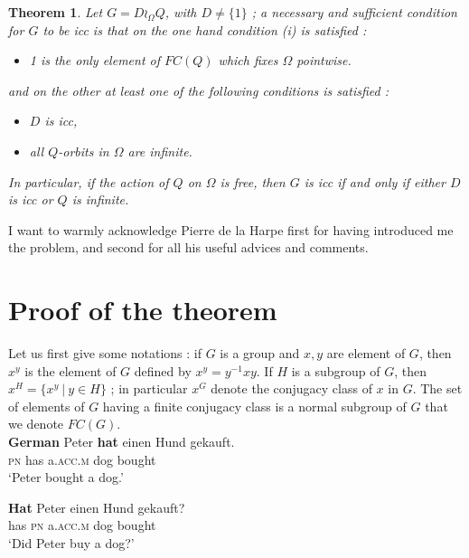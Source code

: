 \documentclass[12pt,oneside]{amsart}
\def\ex{\mathbf{e}}
\newtheorem{theorem}{Theorem}
\begin{document}
\begin{theorem}
Let $G=D\wr_\Omega Q$, with $D\not=\{1\}$ ; a necessary and
sufficient condition for $G$  to be icc is that  on the one hand
condition (i) is satisfied :
\begin{itemize}
\item[\sl(i)]  1 is the only element of $FC(Q)$ which fixes $\Omega$
pointwise. \end{itemize}
 and on the other at least one of the
following conditions is satisfied :
\begin{itemize}
 \item[\sl(ii)] $D$ is icc,
 \item[\sl(iii)] all
$Q$-orbits in $\Omega$ are infinite.
\end{itemize}
In particular, if the action of $Q$ on $\Omega$ is free, then $G$
is icc if and only if either $D$ is icc or $Q$ is infinite.
\end{theorem}




I want to warmly acknowledge Pierre de la Harpe first for having
introduced me the problem, and second for all his useful advices
and
comments.\\


\section{Proof of the theorem}

Let us first give some notations : if $G$ is a group and $x,y$ are
element of $G$, then $x^y$ is the element of $G$ defined by
$x^y=y^{-1}xy$. If $H$ is a subgroup of $G$, then $x^H=\{x^y\ |\
y\in H\}$ ; in particular $x^G$ denote the conjugacy class of $x$
in $G$. The set of elements of $G$ having a finite conjugacy class
is a normal subgroup of $G$ that we denote $FC(G)$. \\



\ea%
    \label{ex:indo:1}
    \textbf{German}
    \ea
    \gll Peter \textbf{{hat}} einen    Hund  gekauft.\\
    \textsc{pn}  has  a.\textsc{acc.m}  dog  bought\\
    \glt`Peter bought a dog.’
     
    \ex
    \gll \textbf{{Hat}} Peter  einen    Hund  gekauft?\\
    has  \textsc{pn}  a.\textsc{acc.m}  dog  bought\\
    \glt ‘Did Peter buy a dog?’
    \z
    \z
\end{document}
